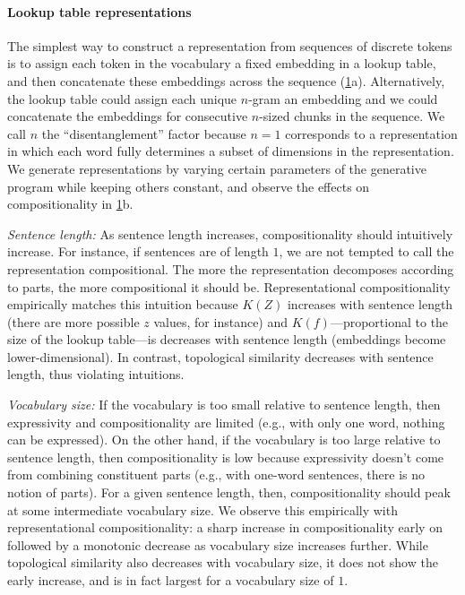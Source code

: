 \documentclass{article} %
\newcommand{\comp}{representational compositionality}
\newcommand{\Comp}{Representational compositionality}
\begin{document}
\begin{figure}[ht]
    \label{fig:synthetic}
\end{figure}

\paragraph{Lookup table representations}

The simplest way to construct a representation from sequences of discrete tokens is to assign each token in the vocabulary a fixed embedding in a lookup table, and then concatenate these embeddings across the sequence (\cref{fig:synthetic}a). Alternatively, the lookup table could assign each unique $n$-gram an embedding and we could concatenate the embeddings for consecutive $n$-sized chunks in the sequence. We call $n$ the ``disentanglement'' factor because $n=1$ corresponds to a representation in which each word fully determines a subset of dimensions in the representation. We generate representations by varying certain parameters of the generative program while keeping others constant, and observe the effects on compositionality in \cref{fig:synthetic}b.

\textit{Sentence length:} As sentence length increases, compositionality should intuitively increase. For instance, if sentences are of length $1$, we are not tempted to call the representation compositional. The more the representation decomposes according to parts, the more compositional it should be. \Comp{} empirically matches this intuition because $K(Z)$ increases with sentence length (there are more possible $z$ values, for instance) and $K(f)$---proportional to the size of the lookup table---is decreases with sentence length (embeddings become lower-dimensional). In contrast, topological similarity decreases with sentence length, thus violating intuitions.

\textit{Vocabulary size:} If the vocabulary is too small relative to sentence length, then expressivity and compositionality are limited (e.g., with only one word, nothing can be expressed). On the other hand, if the vocabulary is too large relative to sentence length, then compositionality is low because expressivity doesn't come from combining constituent parts (e.g., with one-word sentences, there is no notion of parts). For a given sentence length, then, compositionality should peak at some intermediate vocabulary size. We observe this empirically with \comp{}: a sharp increase in compositionality early on followed by a monotonic decrease as vocabulary size increases further. While topological similarity also decreases with vocabulary size, it does not show the early increase, and is in fact largest for a vocabulary size of $1$.
\end{document}

